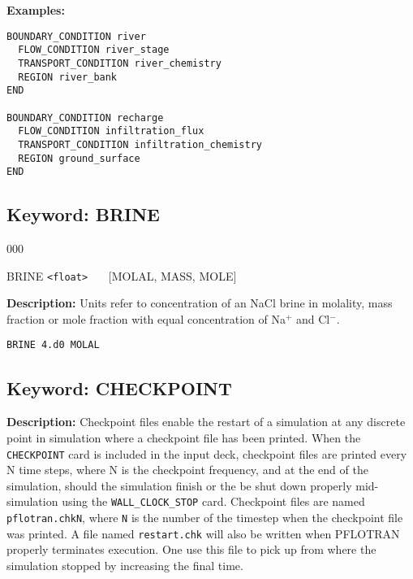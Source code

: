 \newpage
\begin{mdframed}

{\noindent\bf Examples:}

\begin{verbatim}
BOUNDARY_CONDITION river
  FLOW_CONDITION river_stage
  TRANSPORT_CONDITION river_chemistry
  REGION river_bank
END

BOUNDARY_CONDITION recharge
  FLOW_CONDITION infiltration_flux
  TRANSPORT_CONDITION infiltration_chemistry
  REGION ground_surface
END
\end{verbatim}

\end{mdframed}

\hyperlink{target_key}{\return}


\newpage
\protect\hypertarget{target_brine}{}

\subsection{Keyword: BRINE}

\begin{deflist}{000}
\item[BRINE] {\tt <float>} \ \ \ [MOLAL, MASS, MOLE]
\end{deflist}

{\noindent\bf Description:}
Units refer to concentration of an NaCl brine in molality, mass fraction or mole fraction with equal concentration of Na$^+$ and Cl$^-$.

\begin{mdframed}
\begin{verbatim}
BRINE 4.d0 MOLAL
\end{verbatim}
\end{mdframed}

\hyperlink{target_key}{\return}


\newpage
\protect\hypertarget{target_ckpt}{}

\subsection{Keyword: CHECKPOINT}
{\noindent\bf Description:}
Checkpoint files enable the restart of a simulation at any discrete point in simulation where a checkpoint file has been printed.  When the {\tt CHECKPOINT} card is included in the input deck, checkpoint files are printed every N time steps, where N is the checkpoint frequency, and at the end of the simulation, should the simulation finish or the be shut down properly mid-simulation using the {\tt WALL\_CLOCK\_STOP} card.  Checkpoint files are named {\tt pflotran.chkN}, where {\tt N} is the number of the timestep when the checkpoint file was printed.
A file named {\tt restart.chk} will also be written when PFLOTRAN properly terminates execution. One use this file to pick up from where the simulation stopped by increasing the final time.

